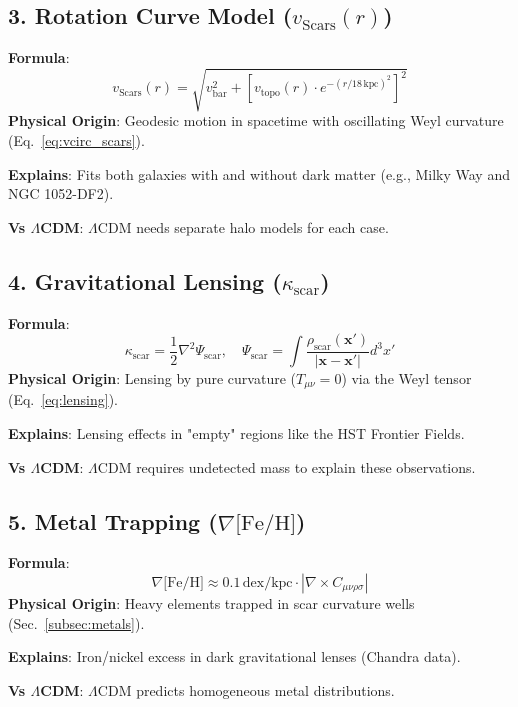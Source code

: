 \documentclass{article}
\begin{document}
\begin{appendix}
\subsection*{3. Rotation Curve Model ($v_{\text{Scars}}(r)$)}  
\textbf{Formula}:  
\[
v_{\text{Scars}}(r) = \sqrt{v_{\text{bar}}^2 + \left[v_{\text{topo}}(r) \cdot e^{-(r/18\,\text{kpc})^2}\right]^2}
\]  
\textbf{Physical Origin}:  
Geodesic motion in spacetime with oscillating Weyl curvature (Eq.~\ref{eq:vcirc_scars}).  \\ \par
\textbf{Explains}:  
Fits both galaxies with and without dark matter (e.g., Milky Way and NGC 1052-DF2). \\ \par  
\textbf{Vs $\Lambda$CDM}:  
$\Lambda$CDM needs separate halo models for each case.  

\subsection*{4. Gravitational Lensing ($\kappa_{\text{scar}}$)}  
\textbf{Formula}:  
\[
\kappa_{\text{scar}} = \frac{1}{2} \nabla^2 \Psi_{\text{scar}}, \quad \Psi_{\text{scar}} = \int \frac{\rho_{\text{scar}}(\mathbf{x}')}{|\mathbf{x} - \mathbf{x}'|} d^3x'
\]  
\textbf{Physical Origin}:  
Lensing by pure curvature ($T_{\mu\nu} = 0$) via the Weyl tensor (Eq.~\ref{eq:lensing}).  \\ \par
\textbf{Explains}:  
Lensing effects in "empty" regions like the HST Frontier Fields.  \\ \par
\textbf{Vs $\Lambda$CDM}:  
$\Lambda$CDM requires undetected mass to explain these observations.  

\subsection*{5. Metal Trapping ($\nabla\text{[Fe/H]}$)}  
\textbf{Formula}:  
\[
\nabla\text{[Fe/H]} \approx 0.1\,\text{dex/kpc} \cdot \left|\nabla \times C_{\mu\nu\rho\sigma}\right|
\]  
\textbf{Physical Origin}:  
Heavy elements trapped in scar curvature wells (Sec.~\ref{subsec:metals}).\\ \par  
\textbf{Explains}:  
Iron/nickel excess in dark gravitational lenses (Chandra data). \\ \par 
\textbf{Vs $\Lambda$CDM}:  
$\Lambda$CDM predicts homogeneous metal distributions.  


\end{appendix}
\end{document}
